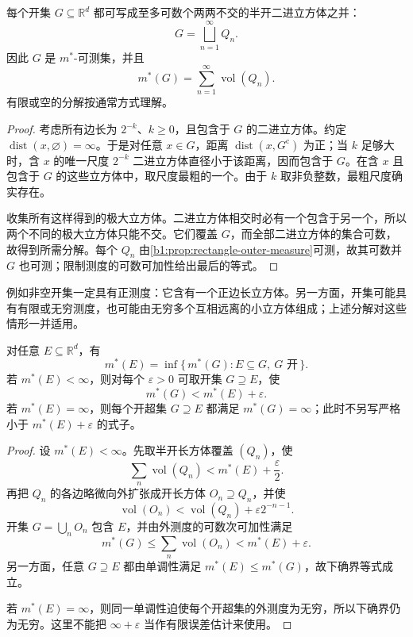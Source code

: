 \begin{proposition}
\label{b1:prop:open-dyadic-decomposition}
每个开集 \(G\subseteq\mathbb R^d\) 都可写成至多可数个两两不交的半开二进立方体之并：
\[
G=\bigsqcup_{n=1}^{\infty}Q_n.
\]
因此 \(G\) 是 \(m^*\)-可测集，并且
\[
m^*(G)=\sum_{n=1}^{\infty}\operatorname{vol}(Q_n).
\]
有限或空的分解按通常方式理解。
\end{proposition}
\begin{proof}
考虑所有边长为 \(2^{-k}\)、\(k\geq0\)，且包含于 \(G\) 的二进立方体。约定 \(\operatorname{dist}(x,\varnothing)=\infty\)。于是对任意 \(x\in G\)，距离 \(\operatorname{dist}(x,G^{\mathrm c})\) 为正；当 \(k\) 足够大时，含 \(x\) 的唯一尺度 \(2^{-k}\) 二进立方体直径小于该距离，因而包含于 \(G\)。在含 \(x\) 且包含于 \(G\) 的这些立方体中，取尺度最粗的一个。由于 \(k\) 取非负整数，最粗尺度确实存在。

收集所有这样得到的极大立方体。二进立方体相交时必有一个包含于另一个，所以两个不同的极大立方体只能不交。它们覆盖 \(G\)，而全部二进立方体的集合可数，故得到所需分解。每个 \(Q_n\) 由\cref{b1:prop:rectangle-outer-measure}可测，故其可数并 \(G\) 也可测；限制测度的可数可加性给出最后的等式。
\end{proof}

例如非空开集一定具有正测度：它含有一个正边长立方体。另一方面，开集可能具有有限或无穷测度，也可能由无穷多个互相远离的小立方体组成；上述分解对这些情形一并适用。

\begin{proposition}
\label{b1:prop:open-cover-approximation}
对任意 \(E\subseteq\mathbb R^d\)，有
\[
m^*(E)=\inf\{\,m^*(G):E\subseteq G,\ G\text{ 开}\,\}.
\]
若 \(m^*(E)<\infty\)，则对每个 \(\varepsilon>0\) 可取开集 \(G\supseteq E\)，使
\[
m^*(G)<m^*(E)+\varepsilon.
\]
若 \(m^*(E)=\infty\)，则每个开超集 \(G\supseteq E\) 都满足 \(m^*(G)=\infty\)；此时不另写严格小于 \(m^*(E)+\varepsilon\) 的式子。
\end{proposition}
\begin{proof}
设 \(m^*(E)<\infty\)。先取半开长方体覆盖 \((Q_n)\)，使
\[
\sum_n\operatorname{vol}(Q_n)<m^*(E)+\frac{\varepsilon}{2}.
\]
再把 \(Q_n\) 的各边略微向外扩张成开长方体 \(O_n\supseteq Q_n\)，并使
\[
\operatorname{vol}(O_n)
<\operatorname{vol}(Q_n)+\varepsilon2^{-n-1}.
\]
开集 \(G=\bigcup_nO_n\) 包含 \(E\)，并由外测度的可数次可加性满足
\[
m^*(G)
\leq\sum_n\operatorname{vol}(O_n)
<m^*(E)+\varepsilon.
\]
另一方面，任意 \(G\supseteq E\) 都由单调性满足 \(m^*(E)\leq m^*(G)\)，故下确界等式成立。

若 \(m^*(E)=\infty\)，则同一单调性迫使每个开超集的外测度为无穷，所以下确界仍为无穷。这里不能把 \(\infty+\varepsilon\) 当作有限误差估计来使用。
\end{proof}
